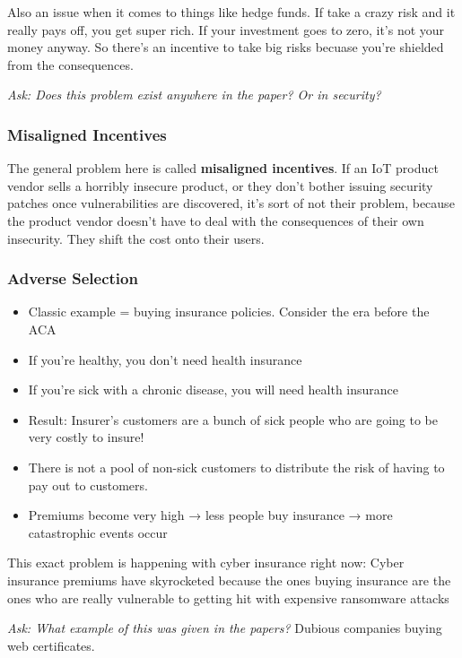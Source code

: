 \documentclass[11pt]{article}
\begin{document}
Also an issue when it comes to things like hedge funds. If take a crazy risk and it really pays off, you get super rich. If your investment goes to zero, it's not your money anyway. So there's an incentive to take big risks becuase you're shielded from the consequences.

{\it Ask: Does this problem exist anywhere in the paper? Or in security?}

\subsubsection{Misaligned Incentives}

The general problem here is called {\bf misaligned incentives}. If an IoT product vendor sells a horribly insecure product, or they don't bother issuing security patches once vulnerabilities are discovered, it's sort of not their problem, because the product vendor doesn't have to deal with the consequences of their own insecurity. They shift the cost onto their users. 

\subsubsection{Adverse Selection}


\begin{itemize}
    \item Classic example = buying insurance policies. Consider the era before the ACA
    \item If you're healthy, you don't need health insurance
    \item If you're sick with a chronic disease, you will need health insurance
    \item Result: Insurer's customers are a bunch of sick people who are going to be very costly to insure!
    \item There is not a pool of non-sick customers to distribute the risk of having to pay out to customers. 
    \item Premiums become very high → less people buy insurance → more catastrophic events occur
\end{itemize}

This exact problem is happening with cyber insurance right now: Cyber insurance premiums have skyrocketed because the ones buying insurance are the ones who are really vulnerable to getting hit with expensive ransomware attacks

{\it Ask: What example of this was given in the papers?} Dubious companies buying web certificates. 
\end{document}
